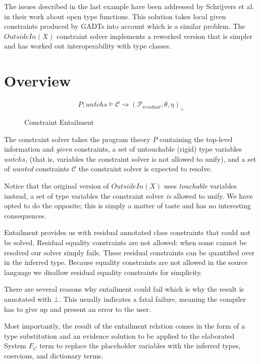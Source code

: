 The issues described in the last example have been addressed by Schrijvers et
al.~\cite{type-checking-with-open-type-functions} in their work about open type
functions. This solution takes local given constraints produced by GADTs into
account which is a similar problem. The $OutsideIn(X)$ constraint solver
implements a reworked version that is simpler and has worked out
interoperability with type classes.

\section{Overview}

\begin{figure}
\[ %
P ; \overline{untchs} \vDash \mathcal{C} \rightsquigarrow
(\mathcal{P}_{residual}, \theta, \eta)_\bot
\]
\caption{Constraint Entailment}
\end{figure}

The constraint solver takes the program theory $P$ containing the top-level
information and \textit{given} constraints, a set of untouchable (rigid) type variables
$\overline{untchs}$, (that is, variables the constraint solver is not allowed
to unify), and a set of \textit{wanted} constraints $\mathcal{C}$ the constraint solver is expected to resolve.

Notice that the original version of $OutsideIn(X)$ uses \textit{touchable} variables instead, a set of
type variables the constraint solver \textit{is} allowed to unify. We have opted to do
the opposite; this is simply a matter of taste and has no interesting
consequences.

Entailment provides us with residual annotated class constraints that could not
be solved. Residual equality constraints are not allowed: when some cannot be
resolved our solver simply fails. These residual constraints can be quantified over
in the inferred type. Because equality constraints are not allowed in the
source language we disallow residual equality constraints for simplicity.

There are several reasons why entailment could fail which is why the result is
annotated with $\bot$. This usually indicates a fatal failure, meaning the
compiler has to give up and present an error to the user.

Most importantly, the result of the entailment relation comes in the form of a
type substitution and an evidence solution to be applied to the elaborated
System $F_C$ term to replace the placeholder variables with the inferred types,
coercions, and dictionary terms.

